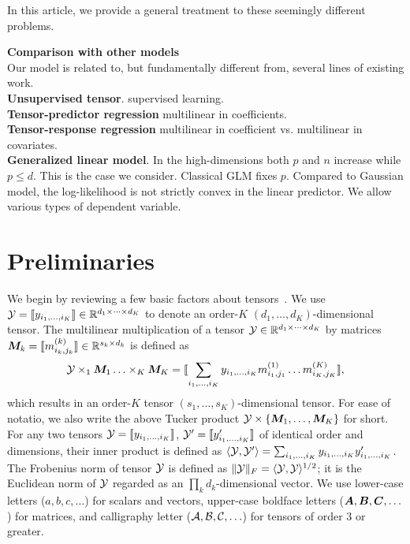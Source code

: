 \documentclass[twoside]{article}
\theoremstyle{plain}
\theoremstyle{definition}
\begin{document}
In this article, we provide a general treatment to these seemingly different problems.

{\bf Comparison with other models}\\
Our model is related to, but fundamentally different from, several lines of existing work.\\
{\bf Unsupervised tensor}. supervised learning. \\
{\bf Tensor-predictor regression} multilinear in coefficients. \\
{\bf Tensor-response regression} multilinear in coefficient vs. multilinear in covariates. \\
{\bf Generalized linear model}. In the high-dimensions both $p$ and $n$ increase while $p \leq d$. This is the case we consider. Classical GLM fixes $p$. Compared to Gaussian model, the log-likelihood is not strictly convex in the linear predictor. We allow various types of dependent variable. 
\section{Preliminaries}

We begin by reviewing a few basic factors about tensors~\cite{kolda2009tensor}. We use $\mathcal{Y}=\llbracket y_{i_1,\ldots,i_K} \rrbracket\in \mathbb{R}^{d_1\times \cdots\times d_K}$ to denote an order-$K$ $(d_1,\ldots,d_K)$-dimensional tensor. The multilinear multiplication of a tensor $\mathcal{Y}\in\mathbb{R}^{d_1\times \cdots\times d_K}$ by matrices $\bm M_k=\llbracket m_{i_k,j_k}^{(k)} \rrbracket\in\mathbb{R}^{s_k\times d_k}$ is defined as
\[
\mathcal{Y} \times_1\bm M_1\ldots \times_K \bm M_K=\llbracket \sum_{i_1,\ldots,i_K}y_{i_1,\ldots,i_K}m_{i_1,j_1}^{(1)}\ldots m_{i_K,j_K}^{(K)} \rrbracket,
\]
which results in an order-$K$ tensor $(s_1,\ldots,s_K)$-dimensional tensor. For ease of notatio, we also write the above Tucker product $\mathcal{Y}\times\{\bm M_1,\ldots,\bm M_K\}$ for short. For any two tensors $\mathcal{Y}=\llbracket y_{i_1,\ldots,i_K} \rrbracket$, $\mathcal{Y}'=\llbracket y'_{i_1,\ldots,i_K} \rrbracket$ of identical order and dimensions, their inner product is defined as $\langle \mathcal{Y}, \mathcal{Y}'\rangle =\sum_{i_1,\ldots,i_K}y_{i_1,\ldots,i_K}y'_{i_1,\ldots,i_K}$. The Frobenius norm of tensor $\mathcal{Y}$ is defined as $\lVert\mathcal{Y}\rVert_F=\langle \mathcal{Y}, \mathcal{Y} \rangle^{1/2}$; it is the Euclidean norm of $\mathcal{Y}$ regarded as an $\prod_k d_k$-dimensional vector. We use lower-case letters ($a,b,c,\ldots$) for scalars and vectors, upper-case boldface letters ($\bm A,\bm B,\bm C,\ldots$) for matrices, and calligraphy letter ($\mathcal{A}, \mathcal{B}, \mathcal{C},\ldots$) for tensors of order 3 or greater. 
\end{document}
